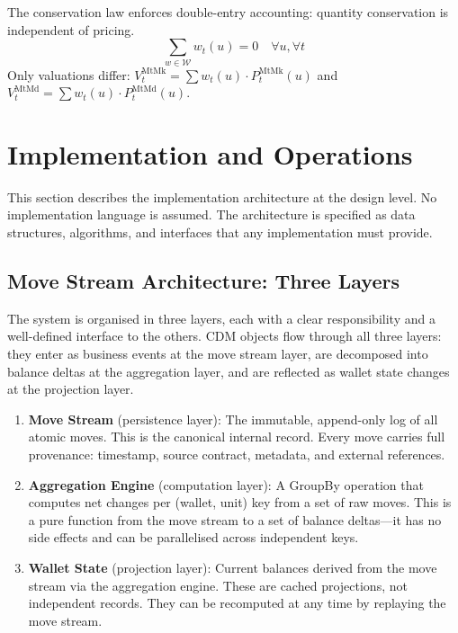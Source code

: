 \documentclass[11pt,a4paper]{article}
\begin{document}
The conservation law enforces double-entry accounting: quantity conservation is independent of pricing.
\[
\sum_{w \in \mathcal{W}} w_t(u) = 0 \quad \forall u, \forall t
\]
Only valuations differ: $V_t^{\text{MtMk}} = \sum w_t(u) \cdot P_t^{\text{MtMk}}(u)$ and $V_t^{\text{MtMd}} = \sum w_t(u) \cdot P_t^{\text{MtMd}}(u)$.

\clearpage
\section{Implementation and Operations}
\label{sec:implementation}

This section describes the implementation architecture at the design level. No implementation language is assumed. The architecture is specified as data structures, algorithms, and interfaces that any implementation must provide.

\subsection{Move Stream Architecture: Three Layers}

The system is organised in three layers, each with a clear responsibility and a well-defined interface to the others. CDM objects flow through all three layers: they enter as business events at the move stream layer, are decomposed into balance deltas at the aggregation layer, and are reflected as wallet state changes at the projection layer.

\begin{enumerate}
\item \textbf{Move Stream} (persistence layer): The immutable, append-only log of all atomic moves. This is the canonical internal record. Every move carries full provenance: timestamp, source contract, metadata, and external references.
\item \textbf{Aggregation Engine} (computation layer): A GroupBy operation that computes net changes per (wallet, unit) key from a set of raw moves. This is a pure function from the move stream to a set of balance deltas---it has no side effects and can be parallelised across independent keys.
\item \textbf{Wallet State} (projection layer): Current balances derived from the move stream via the aggregation engine. These are cached projections, not independent records. They can be recomputed at any time by replaying the move stream.
\end{enumerate}
\end{document}
